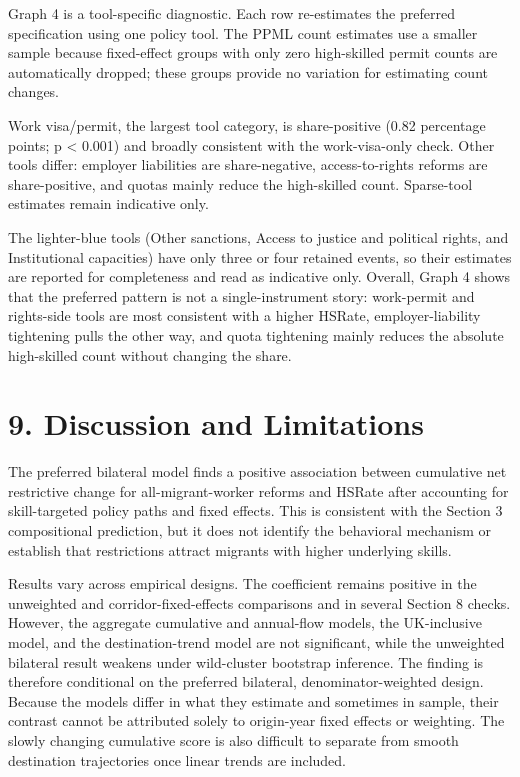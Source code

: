 \documentclass[11pt,a4paper]{article}
\begin{document}
Graph 4 is a tool-specific diagnostic. Each row re-estimates the
preferred specification using one policy tool. The PPML count estimates
use a smaller sample because fixed-effect groups with only zero
high-skilled permit counts are automatically dropped; these groups
provide no variation for estimating count changes.

Work visa/permit, the largest tool category, is share-positive (0.82
percentage points; p \textless{} 0.001) and broadly consistent with the
work-visa-only check. Other tools differ: employer liabilities are
share-negative, access-to-rights reforms are share-positive, and quotas
mainly reduce the high-skilled count. Sparse-tool estimates remain
indicative only.

The lighter-blue tools (Other sanctions, Access to justice and political
rights, and Institutional capacities) have only three or four retained
events, so their estimates are reported for completeness and read as
indicative only. Overall, Graph 4 shows that the preferred pattern is
not a single-instrument story: work-permit and rights-side tools are
most consistent with a higher HSRate, employer-liability tightening
pulls the other way, and quota tightening mainly reduces the absolute
high-skilled count without changing the share.

\clearpage
\section{9. Discussion and
Limitations}\label{discussion-and-limitations}

The preferred bilateral model finds a positive association between
cumulative net restrictive change for all-migrant-worker reforms and
HSRate after accounting for skill-targeted policy paths and fixed
effects. This is consistent with the Section 3 compositional prediction,
but it does not identify the behavioral mechanism or establish that
restrictions attract migrants with higher underlying skills.

Results vary across empirical designs. The coefficient remains positive
in the unweighted and corridor-fixed-effects comparisons and in several
Section 8 checks. However, the aggregate cumulative and annual-flow
models, the UK-inclusive model, and the destination-trend model are not
significant, while the unweighted bilateral result weakens under
wild-cluster bootstrap inference. The finding is therefore conditional
on the preferred bilateral, denominator-weighted design. Because the
models differ in what they estimate and sometimes in sample, their
contrast cannot be attributed solely to origin-year fixed effects or
weighting. The slowly changing cumulative score is also difficult to
separate from smooth destination trajectories once linear trends are
included.
\end{document}
